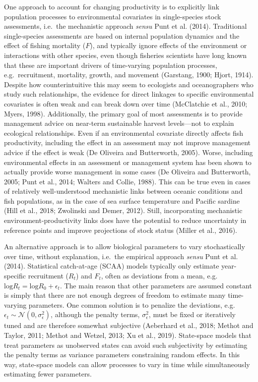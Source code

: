 \documentclass[]{article}
\begin{document}
One approach to account for changing productivity is to explicitly link
population processes to environmental covariates in single-species stock
assessments, i.e.~the mechanistic approach \emph{sensu} Punt et al.
(2014). Traditional single-species assessments are based on internal
population dynamics and the effect of fishing mortality (\(F\)), and
typically ignore effects of the environment or interactions with other
species, even though fisheries scientists have long known that these are
important drivers of time-varying population processes,
e.g.~recruitment, mortality, growth, and movement (Garstang, 1900;
Hjort, 1914). Despite how counterintuitive this may seem to ecologists
and oceanographers who study such relationships, the evidence for direct
linkages to specific environmental covariates is often weak and can
break down over time (McClatchie et al., 2010; Myers, 1998).
Additionally, the primary goal of most assessments is to provide
management advice on near-term sustainable harvest levels---not to
explain ecological relationships. Even if an environmental covariate
directly affects fish productivity, including the effect in an
assessment may not improve management advice if the effect is weak (De
Oliveira and Butterworth, 2005). Worse, including environmental effects
in an assessment or management system has been shown to actually provide
worse management in some cases (De Oliveira and Butterworth, 2005; Punt
et al., 2014; Walters and Collie, 1988). This can be true even in cases
of relatively well-understood mechanistic links between oceanic
conditions and fish populations, as in the case of sea surface
temperature and Pacific sardine (Hill et al., 2018; Zwolinski and Demer,
2012). Still, incorporating mechanistic environment-productivity links
does have the potential to reduce uncertainty in reference points and
improve projections of stock status (Miller et al., 2016).

An alternative approach is to allow biological parameters to vary
stochastically over time, without explanation, i.e.~the empirical
approach \emph{sensu} Punt et al. (2014). Statistical catch-at-age
(SCAA) models typically only estimate year-specific recruitment
(\(R_t\)) and \(F_t\), often as deviations from a mean, e.g.
\(\text{log}R_t = \text{log}R_0 + \epsilon_t\). The main reason that
other parameters are assumed constant is simply that there are not
enough degrees of freedom to estimate many time-varying parameters. One
common solution is to penalize the deviations, e.g.
\(\epsilon_t \sim \mathcal{N}(0,\sigma^2_\epsilon)\), although the
penalty terms, \(\sigma^2_\epsilon\), must be fixed or iteratively tuned
and are therefore somewhat subjective (Aeberhard et al., 2018; Methot
and Taylor, 2011; Methot and Wetzel, 2013; Xu et al., 2019). State-space
models that treat parameters as unobserved states can avoid such
subjectivity by estimating the penalty terms as variance parameters
constraining random effects. In this way, state-space models can allow
processes to vary in time while simultaneously estimating fewer
parameters.
\end{document}
